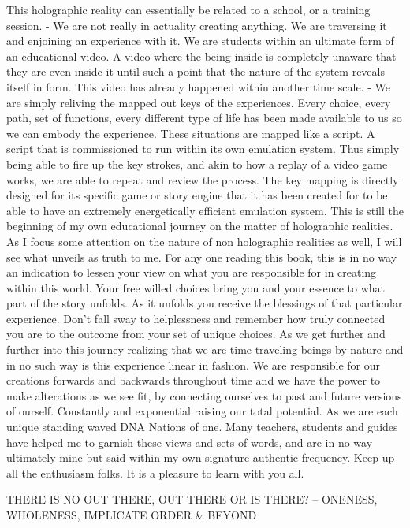 This holographic reality can essentially be related to a school, or a
training session. - We are not really in actuality creating anything. We
are traversing it and enjoining an experience with it. We are students
within an ultimate form of an educational video. A video where the being
inside is completely unaware that they are even inside it until such a
point that the nature of the system reveals itself in form. This video
has already happened within another time scale. - We are simply reliving
the mapped out keys of the experiences. Every choice, every path, set of
functions, every different type of life has been made available to us so
we can embody the experience. These situations are mapped like a script.
A script that is commissioned to run within its own emulation system.
Thus simply being able to fire up the key strokes, and akin to how a
replay of a video game works, we are able to repeat and review the
process. The key mapping is directly designed for its specific game or
story engine that it has been created for to be able to have an
extremely energetically efficient emulation system. This is still the
beginning of my own educational journey on the matter of holographic
realities. As I focus some attention on the nature of non holographic
realities as well, I will see what unveils as truth to me. For any one
reading this book, this is in no way an indication to lessen your view
on what you are responsible for in creating within this world. Your free
willed choices bring you and your essence to what part of the story
unfolds. As it unfolds you receive the blessings of that particular
experience. Don't fall sway to helplessness and remember how truly
connected you are to the outcome from your set of unique choices. As we
get further and further into this journey realizing that we are time
traveling beings by nature and in no such way is this experience linear
in fashion. We are responsible for our creations forwards and backwards
throughout time and we have the power to make alterations as we see fit,
by connecting ourselves to past and future versions of ourself.
Constantly and exponential raising our total potential. As we are each
unique standing waved DNA Nations of one. Many teachers, students and
guides have helped me to garnish these views and sets of words, and are
in no way ultimately mine but said within my own signature authentic
frequency. Keep up all the enthusiasm folks. It is a pleasure to learn
with you all.

THERE IS NO OUT THERE, OUT THERE OR IS THERE? -- ONENESS, WHOLENESS,
IMPLICATE ORDER \& BEYOND


